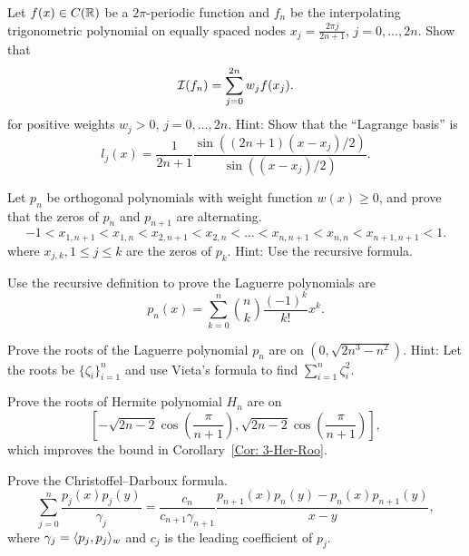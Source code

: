 \begin{problem}
    Let $f(x)\in C(\mathbb R)$ be a $2\pi$-periodic function and $f_n$ be the interpolating trigonometric polynomial on equally spaced nodes $x_j = \frac{2\pi j}{2n+1}$, $j=0,\dots, 2n$. Show that 
    \begin{equation}
       \mathcal I(f_n) = \sum_{j=0}^{2n} w_j f(x_j).
    \end{equation}
    for positive weights $w_j > 0$, $j = 0,\dots, 2n$.
    Hint: Show that the ``Lagrange basis'' is $$l_j(x) =\frac{1}{2n+1} \frac{\sin((2n+1)(x- x_j)/2)}{\sin((x-x_j)/2)}.$$
\end{problem}
\begin{problem}[interlacing]
    Let $p_n$ be orthogonal polynomials with weight function $w(x)\ge 0$, and prove that the zeros of $p_n$ and $p_{n+1}$ are alternating. 
    \begin{equation}
        -1 < x_{1, n+1} < x_{1, n} < x_{2,n+1} < x_{2,n}<\dots < x_{n,n+1} < x_{n, n} < x_{n+1, n+1} < 1.
    \end{equation}
    where $x_{j, k}, 1\le j\le k$ are the zeros of $p_k$. Hint: Use the recursive formula.
\end{problem}
\begin{problem}
\label{Prb: 3-Exe-Lag}
    Use the recursive definition to prove the Laguerre polynomials are 
    \begin{equation}
        p_n(x) = \sum_{k=0}^n \binom{n}{k} \frac{(-1)^k}{k!} x^k.
    \end{equation}
\end{problem}
\begin{problem}
\label{Prb: 3-Exe-5}
    Prove the roots of the Laguerre polynomial $p_n$ are on $(0, \sqrt{2n^3 - n^2})$. Hint: Let the roots be $\{\zeta_i\}_{i=1}^n$ and use Vieta's formula to find $\sum_{i=1}^n \zeta_i^2$. 
\end{problem}

\begin{problem}
    Prove the roots of Hermite polynomial $H_n$ are on $$\left[-\sqrt{2n-2}\cos\left(\frac{\pi}{n+1}\right), \sqrt{2n-2}\cos\left(\frac{\pi}{n+1}\right)\right],$$ which improves the bound in Corollary~\ref{Cor: 3-Her-Roo}.
\end{problem}

\begin{problem}
    Prove the Christoffel–Darboux formula. 
    \begin{equation*}
        \sum_{j=0}^n \frac{p_j(x) p_j(y)}{\gamma_j} = \frac{c_{n}}{c_{n+1}\gamma_{n+1}} \frac{p_{n+1}(x)p_n(y) - p_{n}(x)p_{n+1}(y)}{x - y}, 
    \end{equation*}
    where $\gamma_j = \langle {p_j, p_j} \rangle_w$ and $c_j$ is the leading coefficient of $p_j$.
\end{problem}

